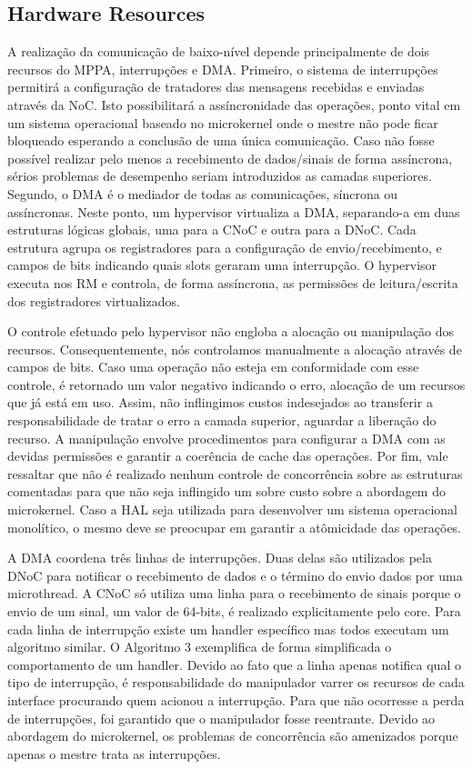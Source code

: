 		\subsection{\mppa Hardware Resources}
		\label{sec.mppa-hardware-resources}

			A realização da comunicação de baixo-nível depende principalmente de dois recursos do MPPA, interrupções e DMA.
			Primeiro, o sistema de interrupções permitirá a configuração de tratadores das mensagens recebidas e enviadas através da NoC.
			Isto possibilitará a assíncronidade das operações, ponto vital em um sistema operacional baseado no microkernel onde o mestre não pode ficar bloqueado esperando a conclusão de uma única comunicação.
			Caso não fosse possível realizar pelo menos a recebimento de dados/sinais de forma assíncrona, sérios problemas de desempenho seriam introduzidos as camadas superiores.
			Segundo, o DMA é o mediador de todas as comunicações, síncrona ou assíncronas.
			Neste ponto, um hypervisor virtualiza a DMA, separando-a em duas estruturas lógicas globais, uma para a CNoC e outra para a DNoC.
			Cada estrutura agrupa os registradores para a configuração de envio/recebimento, e campos de bits indicando quais slots geraram uma interrupção.
			O hypervisor executa nos RM e controla, de forma assíncrona, as permissões de leitura/escrita dos registradores virtualizados.

			O controle efetuado pelo hypervisor não engloba a alocação ou manipulação dos recursos.
			Consequentemente, nós controlamos manualmente a alocação através de campos de bits.
			Caso uma operação não esteja em conformidade com esse controle, é retornado um valor negativo indicando o erro, \eg alocação de um recursos que já está em uso.
			Assim, não inflingimos custos indesejados ao transferir a responsabilidade de tratar o erro a camada superior, \eg aguardar a liberação do recurso.
			A manipulação envolve procedimentos para configurar a DMA com as devidas permissões e garantir a coerência de cache das operações.
			Por fim, vale ressaltar que não é realizado nenhum controle de concorrência sobre as estruturas comentadas para que não seja inflingido um sobre custo sobre a abordagem do microkernel.
			Caso a HAL seja utilizada para desenvolver um sistema operacional monolítico, o mesmo deve se preocupar em garantir a atômicidade das operações.

			A DMA coordena três linhas de interrupções.
			Duas delas são utilizados pela DNoC para notificar o recebimento de dados e o término do envio dados por uma microthread.
			A CNoC só utiliza uma linha para o recebimento de sinais porque o envio de um sinal, um valor de 64-bits, é realizado explicitamente pelo core.
			Para cada linha de interrupção existe um handler específico mas todos executam um algoritmo similar.
			O Algoritmo 3 exemplifica de forma simplificada o comportamento de um handler.
			Devido ao fato que a linha apenas notifica qual o tipo de interrupção, é responsabilidade do manipulador varrer os recursos de cada interface procurando quem acionou a interrupção.
			Para que não ocorresse a perda de interrupções, foi garantido que o manipulador fosse reentrante.
			Devido ao abordagem do microkernel, os problemas de concorrência são amenizados porque apenas o mestre trata as interrupções.

